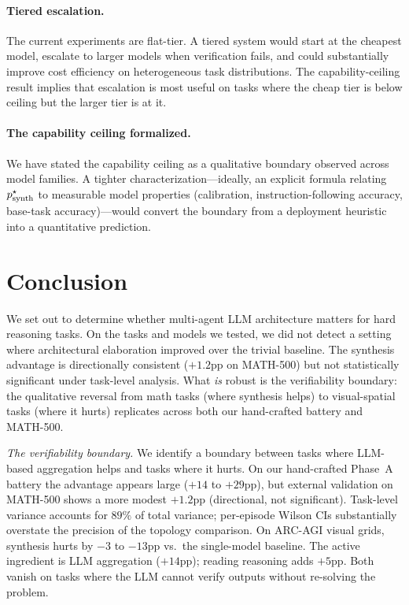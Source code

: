 \documentclass[11pt]{amsart}
\newcommand\1{{\mathds{1}}}
\theoremstyle{definition}
\theoremstyle{remark}
\numberwithin{equation}{section}
\begin{document}
\paragraph{Tiered escalation.}
The current experiments are flat-tier.
A tiered system would start at the cheapest model, escalate to larger models when verification fails, and could substantially improve cost efficiency on heterogeneous task distributions.
The capability-ceiling result implies that escalation is most useful on tasks where the cheap tier is below ceiling but the larger tier is at it.

\paragraph{The capability ceiling formalized.}
We have stated the capability ceiling as a qualitative boundary observed across model families.
A tighter characterization---ideally, an explicit formula relating $p_{\rm synth}^\star$ to measurable model properties (calibration, instruction-following accuracy, base-task accuracy)---would convert the boundary from a deployment heuristic into a quantitative prediction.

\section{Conclusion}\label{sec:conclusion}

We set out to determine whether multi-agent LLM architecture matters for hard reasoning tasks.
On the tasks and models we tested, we did not detect a setting where architectural elaboration improved over the trivial baseline.
The synthesis advantage is directionally consistent ($+1.2$pp on MATH-500) but not statistically significant under task-level analysis.
What \emph{is} robust is the verifiability boundary: the qualitative reversal from math tasks (where synthesis helps) to visual-spatial tasks (where it hurts) replicates across both our hand-crafted battery and MATH-500.

\emph{The verifiability boundary.}
We identify a boundary between tasks where LLM-based aggregation helps and tasks where it hurts.
On our hand-crafted Phase~A battery the advantage appears large ($+14$ to $+29$pp), but external validation on MATH-500 shows a more modest $+1.2$pp (directional, not significant).
Task-level variance accounts for $89\%$ of total variance; per-episode Wilson CIs substantially overstate the precision of the topology comparison.
On ARC-AGI visual grids, synthesis hurts by $-3$ to $-13$pp vs.\ the single-model baseline.
The active ingredient is LLM aggregation ($+14$pp); reading reasoning adds $+5$pp.
Both vanish on tasks where the LLM cannot verify outputs without re-solving the problem.
\end{document}
